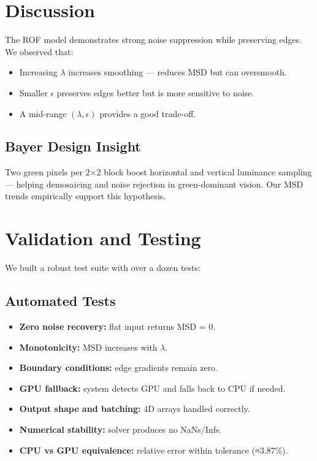 \documentclass[11pt]{article}
\begin{document}
\section*{Discussion}
The ROF model demonstrates strong noise suppression while preserving edges. We observed that:
\begin{itemize}
  \item Increasing \(\lambda\) increases smoothing — reduces MSD but can oversmooth.
  \item Smaller \(\epsilon\) preserves edges better but is more sensitive to noise.
  \item A mid-range \((\lambda, \epsilon)\) provides a good trade-off.
\end{itemize}

\subsection*{Bayer Design Insight}
Two green pixels per 2×2 block boost horizontal and vertical luminance sampling — helping demosaicing and noise rejection in green-dominant vision. Our MSD trends empirically support this hypothesis.

\section*{Validation and Testing}
We built a robust test suite with over a dozen tests:

\subsection*{Automated Tests}
\begin{itemize}
  \item \textbf{Zero noise recovery:} flat input returns MSD = 0.
  \item \textbf{Monotonicity:} MSD increases with \(\lambda\).
  \item \textbf{Boundary conditions:} edge gradients remain zero.
  \item \textbf{GPU fallback:} system detects GPU and falls back to CPU if needed.
  \item \textbf{Output shape and batching:} 4D arrays handled correctly.
  \item \textbf{Numerical stability:} solver produces no NaNs/Infs.
  \item \textbf{CPU vs GPU equivalence:} relative error within tolerance (≈3.87\%).
\end{itemize}
\end{document}
